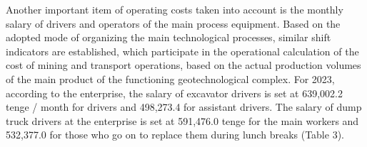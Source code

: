 \begin{multicols}{2}
Another important item of operating costs taken into account is the
monthly salary of drivers and operators of the main process equipment.
Based on the adopted mode of organizing the main technological
processes, similar shift indicators are established, which participate
in the operational calculation of the cost of mining and transport
operations, based on the actual production volumes of the main product
of the functioning geotechnological complex. For 2023, according to the
enterprise, the salary of excavator drivers is set at 639,002.2 tenge /
month for drivers and 498,273.4 for assistant drivers. The salary of
dump truck drivers at the enterprise is set at 591,476.0 tenge for the
main workers and 532,377.0 for those who go on to replace them during
lunch breaks (Table 3).
\end{multicols}

